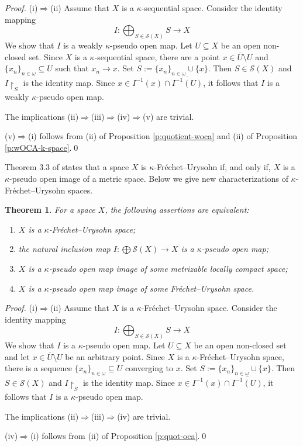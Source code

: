 \documentclass[preprint,11pt]{elsarticle}
\def\dag-{$\kappa$-pseudo open }
\newtheorem{theorem}{Theorem}[section]
\numberwithin{equation}{section}
\numberwithin{theorem}{section}
\newcommand{\w}{\omega}
\newcommand{\Ra}{\Rightarrow}
\newcommand{\SM}{{\setminus}}
\begin{document}
\begin{proof}
(i)$\Ra$(ii) Assume that $X$ is a $\kappa$-sequential space. Consider the identity mapping
\[
I:\bigoplus_{S\in \mathcal{S}(X)} S \to X
\]
We show that $I$ is a weakly \dag-map. Let $U\subseteq X$ be an open non-closed set.  Since $X$ is a $\kappa$-sequential space, there are a point $x\in \overline{U}\SM U$ and  $\{x_n\}_{n\in\w}\subseteq U$ such that $x_n\to x$. Set $S:=\{x_n\}_{n\in\w}\cup\{x\}$. Then $S\in \mathcal{S}(X)$ and $I{\restriction}_S$ is the identity map. Since $x\in I^{-1}(x)\cap \overline{I^{-1}(U)}$, it follows that  $I$ is a weakly  $\kappa$-pseudo open map.
\smallskip

The implications (ii)$\Ra$(iii)$\Ra$(iv)$\Ra$(v) are trivial.
\smallskip

(v)$\Ra$(i) follows from (ii) of Proposition \ref{p:quotient-woca} and (ii) of Proposition \ref{p:wOCA-k-space}.\qed
\end{proof}

Theorem 3.3 of \cite{LiL} states that a space $X$ is $\kappa$-Fr\'{e}chet--Urysohn if, and only if, $X$ is a $\kappa$-pseudo open image of a metric space. Below we give new characterizations of  $\kappa$-Fr\'{e}chet--Urysohn spaces.


\begin{theorem} \label{t:character-kappa-FU}
For a space $X$, the following assertions are equivalent:
\begin{enumerate}
\item[{\rm(i)}] $X$ is a $\kappa$-Fr\'{e}chet--Urysohn space;
\item[{\rm(ii)}] the natural inclusion map $I: \bigoplus\mathcal{S}(X)\to X$ is a  $\kappa$-pseudo open map;
\item[{\rm(iii)}] $X$ is a  $\kappa$-pseudo open map image of some metrizable locally compact space;
\item[{\rm(iv)}] $X$ is a  $\kappa$-pseudo open map image of some Fr\'{e}chet--Urysohn space.
\end{enumerate}
\end{theorem}

\begin{proof}
(i)$\Ra$(ii) Assume that $X$ is a $\kappa$-Fr\'{e}chet--Urysohn space. Consider the identity mapping
\[
I:\bigoplus_{S\in \mathcal{S}(X)} S \to X
\]
We show that $I$ is a  $\kappa$-pseudo open map. Let $U\subseteq X$ be an open non-closed set and let $x\in \overline{U}\SM U$ be an arbitrary point.  Since $X$ is a $\kappa$-Fr\'{e}chet--Urysohn space, there is a sequence  $\{x_n\}_{n\in\w}\subseteq U$ converging to $x$. Set $S:=\{x_n\}_{n\in\w}\cup\{x\}$. Then $S\in \mathcal{S}(X)$ and $I{\restriction}_S$ is the identity map. Since $x\in I^{-1}(x)\cap \overline{I^{-1}(U)}$, it follows that  $I$ is a \dag-map.
\smallskip

The implications (ii)$\Ra$(iii)$\Ra$(iv) are trivial.
\smallskip

(iv)$\Ra$(i) follows from (ii) of Proposition \ref{p:quot-oca}.\qed %
\end{proof}
\end{document}
